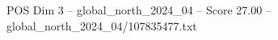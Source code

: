 \begin{textsample}{POS Dim 3 – global\_north\_2024\_04 – Score 27.00 – global\_north\_2024\_04/107835477.txt}
\end{textsample}
